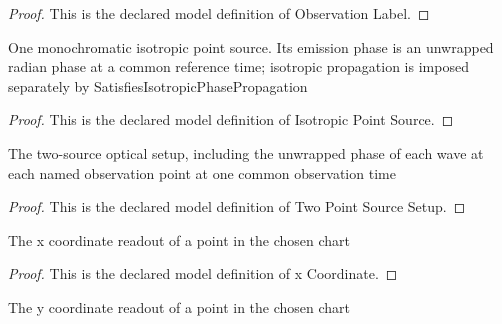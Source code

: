 \begin{proof}
  This is the declared model definition of Observation Label.
\end{proof}
\begin{definition}
  \label{def:physics:phyx-mini-0087:phyxminiproblems-problemphyxmini0087-isotropicpointsource}
  One monochromatic isotropic point source. Its emission phase is an unwrapped radian phase at a common reference time; isotropic propagation is imposed separately by SatisfiesIsotropicPhasePropagation
\end{definition}
\begin{proof}
  This is the declared model definition of Isotropic Point Source.
\end{proof}
\begin{definition}
  \label{def:physics:phyx-mini-0087:phyxminiproblems-problemphyxmini0087-twopointsourcesetup}
  The two-source optical setup, including the unwrapped phase of each wave at each named observation point at one common observation time
\end{definition}
\begin{proof}
  This is the declared model definition of Two Point Source Setup.
\end{proof}
\begin{definition}[x Coordinate]
  \label{def:physics:phyx-mini-0087:phyxminiproblems-problemphyxmini0087-xcoordinate}
  The x coordinate readout of a point in the chosen chart
\end{definition}
\begin{proof}
  This is the declared model definition of x Coordinate.
\end{proof}
\begin{definition}[y Coordinate]
  \label{def:physics:phyx-mini-0087:phyxminiproblems-problemphyxmini0087-ycoordinate}
  The y coordinate readout of a point in the chosen chart
\end{definition}
